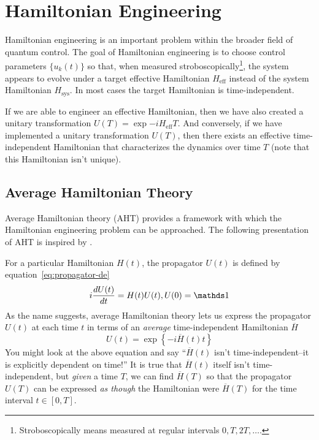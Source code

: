 \section{Hamiltonian Engineering}

Hamiltonian engineering is an important problem within the broader field of quantum control. The goal of Hamiltonian engineering is to choose control parameters $\{u_k(t)\}$ so that, when measured stroboscopically\footnote{Stroboscopically means measured at regular intervals $0, T, 2T, \dots$.}, the system appears to evolve under a target effective Hamiltonian $H_{\text{eff}}$ instead of the system Hamiltonian $H_{\text{sys}}$. In most cases the target Hamiltonian is time-independent.

If we are able to engineer an effective Hamiltonian, then we have also created a unitary transformation $U(T) = \exp{-i H_{\text{eff}} T}$. And conversely, if we have implemented a unitary transformation $U(T)$, then there exists an effective time-independent Hamiltonian that characterizes the dynamics over time $T$ (note that this Hamiltonian isn't unique).

\subsection{Average Hamiltonian Theory}\label{sec:AHT}

Average Hamiltonian theory (AHT) provides a framework with which the Hamiltonian engineering problem can be approached. The following presentation of AHT is inspired by \cite{brinkmann_2016, gerstein-dybowski, 1976ii}.

For a particular Hamiltonian $H(t)$, the propagator $U(t)$ is defined by equation~\ref{eq:propagator-de}
\[
i \ddt{U(t)} = H(t) U(t), U(0) = \identity
\]
As the name suggests, average Hamiltonian theory lets us express the propagator $U(t)$ at each time $t$ in terms of an \emph{average} time-independent Hamiltonian $\overline{H}$
\[
U(t) = \exp\left\{-i \overline{H}(t) t \right\}
\]
You might look at the above equation and say ``$\overline{H}(t)$ isn't time-independent--it is explicitly dependent on time!'' It is true that $\overline{H}(t)$ itself isn't time-independent, but \emph{given} a time $T$, we can find $\overline{H}(T)$ so that the propagator $U(T)$ can be expressed \emph{as though} the Hamiltonian were $\overline{H}(T)$ for the time interval $t \in [0, T]$.

